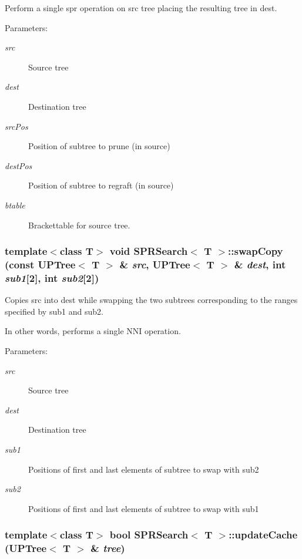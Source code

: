 Perform a single spr operation on src tree placing the resulting tree in dest. 

\begin{Desc}
\item[Parameters:]
\begin{description}
\item[{\em src}]Source tree \item[{\em dest}]Destination tree \item[{\em src\-Pos}]Position of subtree to prune (in source) \item[{\em dest\-Pos}]Position of subtree to regraft (in source) \item[{\em btable}]Brackettable for source tree. \end{description}
\end{Desc}
\subsubsection{\setlength{\rightskip}{0pt plus 5cm}template$<$class T$>$ void {\bf SPRSearch}$<$ T $>$::swap\-Copy (const {\bf UPTree}$<$ T $>$ \& {\em src}, {\bf UPTree}$<$ T $>$ \& {\em dest}, int {\em sub1}[2], int {\em sub2}[2])\hspace{0.3cm}{\tt  [protected]}}\label{classSPRSearch_b2}


Copies src into dest while swapping the two subtrees corresponding to the ranges specified by sub1 and sub2. 

In other words, performs a single NNI operation. \begin{Desc}
\item[Parameters:]
\begin{description}
\item[{\em src}]Source tree \item[{\em dest}]Destination tree \item[{\em sub1}]Positions of first and last elements of subtree to swap with sub2 \item[{\em sub2}]Positions of first and last elements of subtree to swap with sub1 \end{description}
\end{Desc}
\subsubsection{\setlength{\rightskip}{0pt plus 5cm}template$<$class T$>$ bool {\bf SPRSearch}$<$ T $>$::update\-Cache ({\bf UPTree}$<$ T $>$ \& {\em tree})\hspace{0.3cm}{\tt  [protected]}}\label{classSPRSearch_b4}


